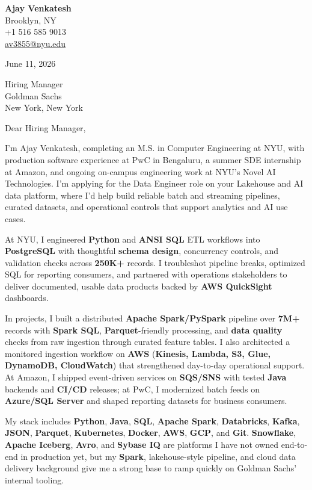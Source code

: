 \documentclass[letterpaper,11pt]{article}
\begin{document}
\begin{flushleft}
\textbf{\large Ajay Venkatesh} \\
Brooklyn, NY \\
+1 516 585 9013 \\
\href{mailto:av3855@nyu.edu}{av3855@nyu.edu}
\end{flushleft}
\vspace{10pt}
June 11, 2026
\vspace{6pt}

Hiring Manager \\
Goldman Sachs \\
New York, New York

\vspace{10pt}

Dear Hiring Manager,

I'm Ajay Venkatesh, completing an M.S. in Computer Engineering at NYU, with production software experience at PwC in Bengaluru, a summer SDE internship at Amazon, and ongoing on-campus engineering work at NYU's Novel AI Technologies. I'm applying for the Data Engineer role on your Lakehouse and AI data platform, where I'd help build reliable batch and streaming pipelines, curated datasets, and operational controls that support analytics and AI use cases.

At NYU, I engineered \textbf{Python} and \textbf{ANSI SQL} ETL workflows into \textbf{PostgreSQL} with thoughtful \textbf{schema design}, concurrency controls, and validation checks across \textbf{250K+} records. I troubleshot pipeline breaks, optimized SQL for reporting consumers, and partnered with operations stakeholders to deliver documented, usable data products backed by \textbf{AWS QuickSight} dashboards.

In projects, I built a distributed \textbf{Apache Spark/PySpark} pipeline over \textbf{7M+} records with \textbf{Spark SQL}, \textbf{Parquet}-friendly processing, and \textbf{data quality} checks from raw ingestion through curated feature tables. I also architected a monitored ingestion workflow on \textbf{AWS} (\textbf{Kinesis, Lambda, S3, Glue, DynamoDB, CloudWatch}) that strengthened day-to-day operational support. At Amazon, I shipped event-driven services on \textbf{SQS/SNS} with tested \textbf{Java} backends and \textbf{CI/CD} releases; at PwC, I modernized batch feeds on \textbf{Azure/SQL Server} and shaped reporting datasets for business consumers.

My stack includes \textbf{Python}, \textbf{Java}, \textbf{SQL}, \textbf{Apache Spark}, \textbf{Databricks}, \textbf{Kafka}, \textbf{JSON}, \textbf{Parquet}, \textbf{Kubernetes}, \textbf{Docker}, \textbf{AWS}, \textbf{GCP}, and \textbf{Git}. \textbf{Snowflake}, \textbf{Apache Iceberg}, \textbf{Avro}, and \textbf{Sybase IQ} are platforms I have not owned end-to-end in production yet, but my \textbf{Spark}, lakehouse-style pipeline, and cloud data delivery background give me a strong base to ramp quickly on Goldman Sachs' internal tooling.
\end{document}
